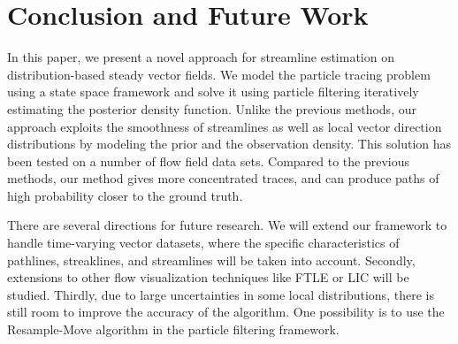 \section{Conclusion and Future Work}

In this paper, we present a novel approach for streamline estimation on distribution-based steady vector fields. We model the particle tracing problem using a state space framework and solve it using particle filtering iteratively estimating the posterior density function. Unlike the previous methods, our approach exploits the smoothness of streamlines as well as local vector direction distributions by modeling the prior and the observation density. This solution has been tested on a number of flow field data sets. Compared to the previous methods, our method gives more concentrated traces, and can produce paths of high probability closer to the ground truth.

There are several directions for future research. We will extend our framework to handle time-varying vector datasets, where the specific characteristics of pathlines, streaklines, and streamlines will be taken into account. Secondly, extensions to other flow visualization techniques like FTLE or LIC will be studied. Thirdly, due to large uncertainties in some local distributions, there is still room to improve the accuracy of the algorithm. One possibility is to use the Resample-Move algorithm in the particle filtering framework.
